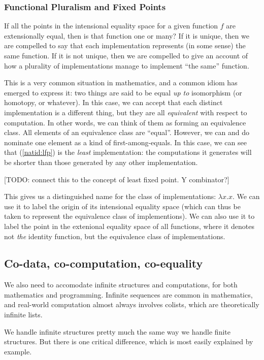 \subsubsection{Functional Pluralism and Fixed Points}

If all the points in the intensional equality space for a given
function \(f\) are extensionally equal, then is that function one or
many? If it is unique, then we are compelled to say that each
implementation represents (in some sense) the same function. If it is
not unique, then we are compelled to give an account of how a
plurality of implementations manage to implement ``the same''
function.

This is a very common situation in mathematics, and a common idiom has
emerged to express it: two things are said to be equal \textit{up to}
isomorphism (or homotopy, or whatever). In this case, we can accept
that each distinct implementation is a different thing, but they are
all \textit{equivalent} with respect to computation. In other words,
we can think of them as forming an equivalence class. All elements of
an equivalence class are ``equal''. However, we can and do nominate
one element as a kind of first-among-equals. In this case, we can see
that (\ref{natid:lfp}) is the \textit{least} implementation: the
computations it generates will be shorter than those generated by any
other implementation.

[TODO: connect this to the concept of least fixed point. Y combinator?]

This gives us a distinguished name for the class of implementations:
\(\lambda x.x\). We can use it to label the origin of its intensional
equality space (which can thus be taken to represent the equivalence
class of implementions). We can also use it to label the point in the
extenional equality space of all functions, where it denotes not
\textit{the} identity function, but the equivalence class of
implementations.

\subsection{Co-data, co-computation, co-equality}

We also need to accomodate infinite structures and computations, for
both mathematics and programming. Infinite sequences are common in
mathematics, and real-world computation almost always involves
colists, which are theoretically infinite lists.

We handle infinite structures pretty much the same way we handle
finite structures. But there is one critical difference, which is most
easily explained by example.

